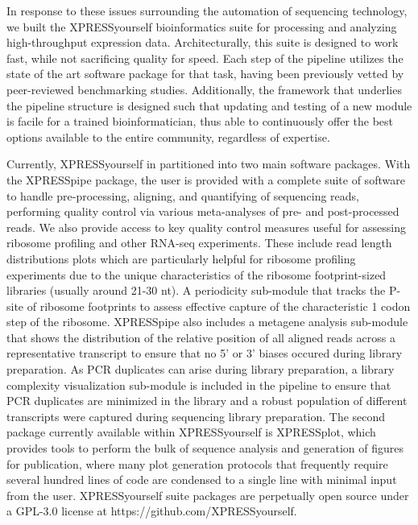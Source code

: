 \documentclass[11pt, a4paper, oneside]{article}
\begin{document}
In response to these issues surrounding the automation of sequencing technology, we built the XPRESSyourself bioinformatics suite for processing and analyzing high-throughput expression data. Architecturally, this suite is designed to work fast, while not sacrificing quality for speed. Each step of the pipeline utilizes the state of the art software package for that task, having been previously vetted by peer-reviewed benchmarking studies. Additionally, the framework that underlies the pipeline structure is designed such that updating and testing of a new module is facile for a trained bioinformatician, thus able to continuously offer the best options available to the entire community, regardless of expertise. \par

Currently, XPRESSyourself in partitioned into two main software packages. With the XPRESSpipe package, the user is provided with a complete suite of software to handle pre-processing, aligning, and quantifying of sequencing reads, performing quality control via various meta-analyses of pre- and post-processed reads. We also provide access to key quality control measures useful for assessing ribosome profiling and other RNA-seq experiments. These include read length distributions plots which are particularly helpful for ribosome profiling experiments due to the unique characteristics of the ribosome footprint-sized libraries (usually around 21-30 nt). A periodicity sub-module that tracks the P-site of ribosome footprints to assess effective capture of the characteristic 1 codon step of the ribosome. XPRESSpipe also includes a metagene analysis sub-module that shows the distribution of the relative position of all aligned reads across a representative transcript to ensure that no 5' or 3' biases occured during library preparation. As PCR duplicates can arise during library preparation, a library complexity visualization sub-module is included in the pipeline to ensure that PCR duplicates are minimized in the library and a robust population of different transcripts were captured during sequencing library preparation. The second package currently available within XPRESSyourself is XPRESSplot, which provides tools to perform the bulk of sequence analysis and generation of figures for publication, where many plot generation protocols that frequently require several hundred lines of code are condensed to a single line with minimal input from the user. XPRESSyourself suite packages are perpetually open source under a GPL-3.0 license at https://github.com/XPRESSyourself.
\end{document}

